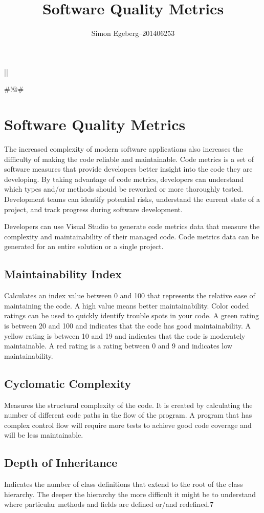\documentclass{article}
\title{Software Quality Metrics}
\author{Simon Egeberg--201406253}
\begin{document}
||
\maketitle#!@#
\section{Software Quality Metrics}
The increased complexity of modern software applications also increases the difficulty of making the code reliable and maintainable. Code metrics is a set of software measures that provide developers better insight into the code they are developing. By taking advantage of code metrics, developers can understand which types and/or methods should be reworked or more thoroughly tested. Development teams can identify potential risks, understand the current state of a project, and track progress during software development.

Developers can use Visual Studio to generate code metrics data that measure the complexity and maintainability of their managed code. Code metrics data can be generated for an entire solution or a single project.
\subsection{Maintainability Index}
Calculates an index value between 0 and 100 that represents the relative ease of maintaining the code. A high value means better maintainability. Color coded ratings can be used to quickly identify trouble spots in your code. A green rating is between 20 and 100 and indicates that the code has good maintainability. A yellow rating is between 10 and 19 and indicates that the code is moderately maintainable. A red rating is a rating between 0 and 9 and indicates low maintainability.
\subsection{Cyclomatic Complexity}
Measures the structural complexity of the code. It is created by calculating the number of different code paths in the flow of the program. A program that has complex control flow will require more tests to achieve good code coverage and will be less maintainable.
\subsection{Depth of Inheritance}
Indicates the number of class definitions that extend to the root of the class hierarchy. The deeper the hierarchy the more difficult it might be to understand where particular methods and fields are defined or/and redefined.7
\end{document}

